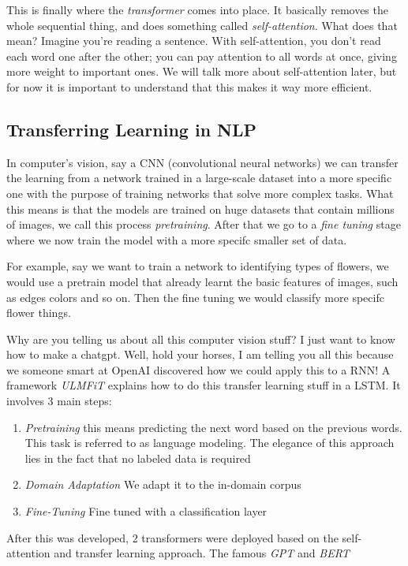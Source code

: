 \documentclass[twocolumn]{article}
\begin{document}
This is finally where the \emph{transformer} comes into place. It basically
removes the whole sequential thing, and does something called
\emph{self-attention}. What does that mean? Imagine you're reading a
sentence. With self-attention, you don't read each word one after the other;
you can pay attention to all words at once, giving more weight to important
ones. We will talk more about self-attention later, but for now it is
important to understand that this makes it way more efficient.

\subsection{Transferring Learning in NLP}

In computer's vision, say a CNN (convolutional neural networks) we can transfer
the learning from a network trained in a large-scale dataset into a more
specific one with the purpose of training networks that solve more complex
tasks. What this means is that the models are trained on huge datasets that
contain millions of images, we call this process \emph{pretraining}. After that
we go to a \emph{fine tuning} stage where we now train the model with a more
specifc smaller set of data.

For example, say we want to train a network to identifying types of flowers, we
would use a pretrain model that already learnt the basic features of images,
such as edges colors and so on. Then the fine tuning we would classify more
specifc flower things.

Why are you telling us about all this computer vision stuff? I just want to
know how to make a chatgpt. Well, hold your horses, I am telling you all this
because we someone smart at OpenAI discovered how we could apply this to a RNN!
A framework \emph{ULMFiT} explains how to do this transfer learning stuff in a
LSTM. It involves 3 main steps:


\begin{enumerate}
    \item \emph{Pretraining} this means predicting the next word based on the previous words.
    This task is referred to as language modeling. The elegance of this
        approach lies in the fact that no labeled data is required
    \item \emph{Domain Adaptation}
        We adapt it to the in-domain corpus
    \item \emph{Fine-Tuning}
        Fine tuned with a classification layer
\end{enumerate}

After this was developed, 2 transformers were deployed based on the
self-attention and transfer learning approach. The famous \emph{GPT} and
\emph{BERT}
\end{document}

